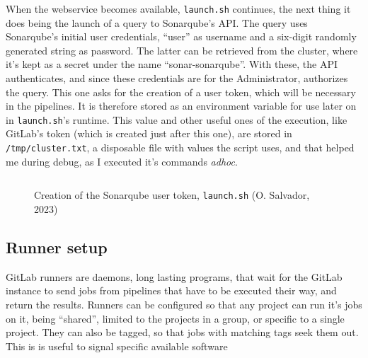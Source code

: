 \documentclass[11pt]{article}
\begin{document}
\begin{flushleft}
    When the webservice becomes available, \texttt{launch.sh} continues, the next thing it does being the launch of a query to Sonarqube's API. The query uses Sonarqube's initial user credentials, ``user'' as username and a six-digit randomly generated string as password. The latter can be retrieved from the cluster, where it's kept as a secret under the name ``sonar-sonarqube''. With these, the API authenticates, and since these credentials are for the Administrator, authorizes the query. This one asks for the creation of a user token, which will be necessary in the pipelines. It is therefore stored as an environment variable for use later on in \texttt{launch.sh}'s runtime. This value and other useful ones of the execution, like GitLab's token (which is created just after this one), are stored in \texttt{/tmp/cluster.txt}, a disposable file with values the script uses, and that helped me during debug, as I executed it's commands \textit{\gls{adhoc}}.
    \linebreak
    
        \begin{figure}[htb]
            \centering
            \begin{subfigure}{.8\textwidth}
                \hspace{-5cm}
                \inputminted[fontsize=\scriptsize, firstline=15, lastline=17, linenos, frame=single, tabsize=1, breaklines]{bash}{../../launch.sh}
              \end{subfigure}
            \caption{Creation of the Sonarqube user token, \texttt{launch.sh} (O. Salvador, 2023)}
        \end{figure}


    
    \clearpage
    \subsection{Runner setup}
    GitLab runners are daemons, long lasting programs, that wait for the GitLab instance to send jobs from pipelines that have to be executed their way, and return the results. Runners can be configured so that any project can run it's jobs on it, being ``shared'', limited to the projects in a group, or specific to a single project. They can also be tagged, so that jobs with matching tags seek them out. This is is useful to signal specific available software
    \linebreak


\end{flushleft}
\end{document}
